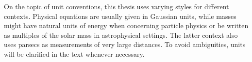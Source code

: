 On the topic of unit conventions, this thesis uses varying styles for different contexts. Physical equations are usually given
in Gaussian units, while masses might have natural units of energy when concerning particle physics or be written as multiples
of the solar mass in astrophysical settings. The latter context also uses parsecs as measurements of very large distances.
To avoid ambiguities, units will be clarified in the text whenever necessary.
